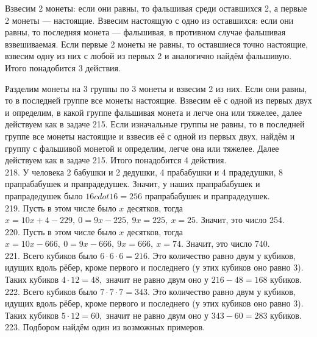 \documentclass[12pt]{article}
\begin{document}
Взвесим 2 монеты: если они равны, то фальшивая среди оставшихся 2, а первые 2 монеты --- настоящие. Взвесим настоящую с одно из оставшихся: если они равны, то последняя монета --- фальшивая, в противном случае фальшивая взвешиваемая. Если первые 2 монеты не равны, то оставшиеся точно настоящие, взвесим одну из них с любой из первых 2 и аналогично найдём фальшивую. Итого понадобится 3 действия.

Разделим монеты на 3 группы по 3 монеты и взвесим 2 из них. Если они равны, то в последней группе все монеты настоящие. Взвесим её с одной из первых двух и определим, в какой группе фальшивая монета и легче она или тяжелее, далее действуем как в задаче 215. Если изначальные группы не равны, то в последней группе все монеты настоящие и взвесив её с одной из первых двух, найдём и группу с фальшивой монетой и определим, легче она или тяжелее. Далее действуем как в задаче 215. Итого понадобится 4 действия.\\
218. У человека 2 бабушки и 2 дедушки, 4 прабабушки и 4 прадедушки, 8 прапрабабушек и прапрадедушек. Значит, у наших прапрабабушек и прапрадедушек было $16cdot16=256$ прапрабабушек и прапрадедушек.\\
219. Пусть в этом числе было $x$ десятков, тогда $x=10x+4-229,\ 0=9x-225,\ 9x=225,\ x=25.$ Значит, это число 254.\\
220. Пусть в этом числе было $x$ десятков, тогда $x=10x-666,\ 0=9x-666,\ 9x=666,\ x=74.$ Значит, это число 740.\\
221. Всего кубиков было $6\cdot6\cdot6=216.$ Это количество равно двум у кубиков, идущих вдоль рёбер, кроме первого и последнего (у этих кубиков оно равно 3).
Таких кубиков $4\cdot12=48,$ значит не равно двум оно у $216-48=168$ кубиков.\\
222. Всего кубиков было $7\cdot7\cdot7=343.$ Это количество равно двум у кубиков, идущих вдоль рёбер, кроме первого и последнего (у этих кубиков оно равно 3).
Таких кубиков $5\cdot12=60,$ значит не равно двум оно у $343-60=283$ кубиков.\\
223. Подбором найдём один из возможных примеров.
\begin{center}
\begin{figure}[ht!]
\end{figure}
\end{center}
\end{document}
